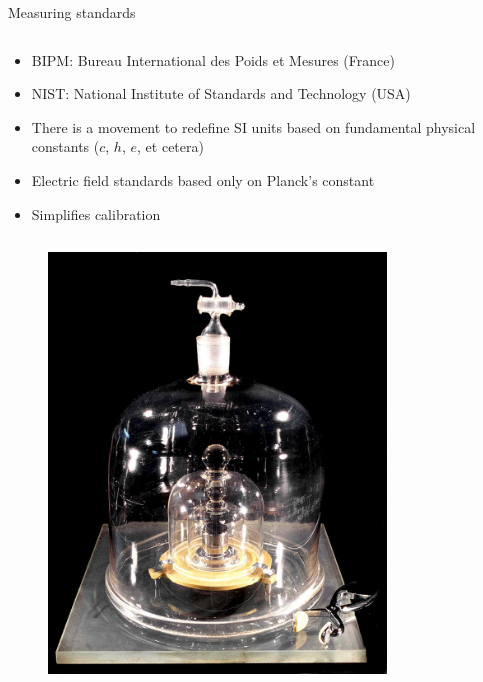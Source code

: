 \begin{columnframe}{Measuring standards}
    \begin{column}{0.48\textwidth}
        \begin{itemize}
            \item BIPM: Bureau International des Poids et Mesures (France)
            \item NIST: National Institute of Standards and Technology (USA)
            \item There is a movement to redefine SI units based on fundamental physical constants ($c$, $h$, $e$, et cetera)
            \item Electric field standards based only on Planck's constant
            \item Simplifies calibration
        \end{itemize}
    \end{column}
    \begin{column}{0.48\textwidth}
        \begin{figure}
            \centering
            \includegraphics[width=0.8\textwidth]{images/international_prototype_of_the_kilogram.jpg}
        \end{figure}
    \end{column}
\end{columnframe}

